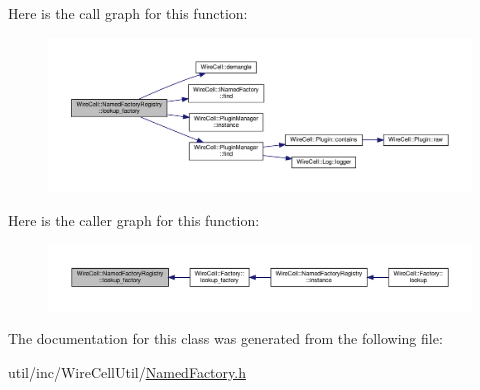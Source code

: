 Here is the call graph for this function\+:
\nopagebreak
\begin{figure}[H]
\begin{center}
\leavevmode
\includegraphics[width=350pt]{class_wire_cell_1_1_named_factory_registry_a355e9be03e1950d63a14ae9bb2989918_cgraph}
\end{center}
\end{figure}
Here is the caller graph for this function\+:
\nopagebreak
\begin{figure}[H]
\begin{center}
\leavevmode
\includegraphics[width=350pt]{class_wire_cell_1_1_named_factory_registry_a355e9be03e1950d63a14ae9bb2989918_icgraph}
\end{center}
\end{figure}


The documentation for this class was generated from the following file\+:\begin{DoxyCompactItemize}
\item 
util/inc/\+Wire\+Cell\+Util/\hyperlink{_named_factory_8h}{Named\+Factory.\+h}\end{DoxyCompactItemize}
